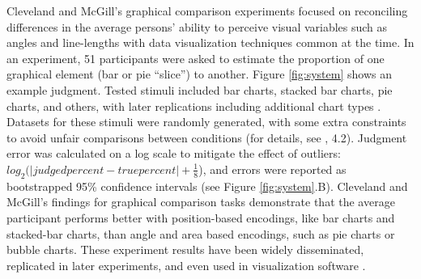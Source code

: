 \documentclass[11pt]{article}
\begin{document}
Cleveland and McGill's graphical comparison experiments \cite{cleveland1984graphical} focused on reconciling differences in the average persons' ability to perceive visual variables such as angles and line-lengths with data visualization techniques common at the time.
In an experiment, 51 participants were asked to estimate the proportion of one graphical element (\eg bar or pie ``slice'') to another.
Figure \ref{fig:system} shows an example judgment.
Tested stimuli included bar charts, stacked bar charts, pie charts, and others, with later replications including additional chart types \cite{heer2010crowdsourcing}.
Datasets for these stimuli were randomly generated, with some extra constraints to avoid unfair comparisons between conditions (for details, see \cite{cleveland1984graphical}, 4.2).
Judgment error was calculated on a log scale to mitigate the effect of outliers: $log_{2}(|judged percent - true percent| + \frac{1}{8}$), and errors were reported as bootstrapped 95\% confidence intervals (see Figure \ref{fig:system}.B).
Cleveland and McGill's findings for graphical comparison tasks demonstrate that the average participant performs better with position-based encodings, like bar charts and stacked-bar charts, than angle and area based encodings, such as pie charts or bubble charts.
These experiment results have been widely disseminated, replicated in later experiments, and even used in visualization software \cite{mackinlay1986automating, mackinlay2007show}.
\end{document}

